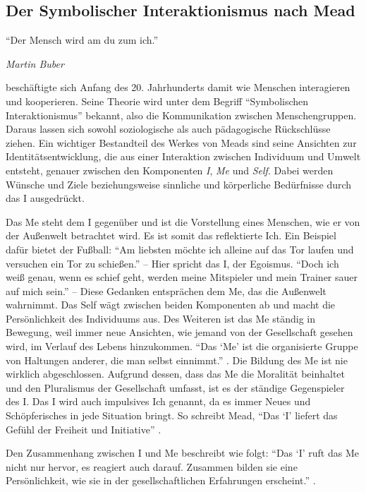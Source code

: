 \subsection{Der Symbolischer Interaktionismus nach Mead}

\epigraph{
		``Der Mensch wird am du zum ich.''}
	{
		\emph{Martin Buber
	}

\citeauthor{mead-1934en} beschäftigte sich Anfang des 20. Jahrhunderts damit wie Menschen interagieren und kooperieren.
Seine Theorie wird unter dem Begriff ``Symbolischen Interaktionismus'' bekannt, also die Kommunikation zwischen Menschengruppen.
Daraus lassen sich sowohl soziologische als auch pädagogische Rückschlüsse ziehen.
Ein wichtiger Bestandteil des Werkes von Meads sind seine Ansichten zur Identitätsentwicklung, die aus einer Interaktion zwischen Individuum und Umwelt entsteht, genauer zwischen den Komponenten \emph{I}, \emph{Me} und \emph{Self}.
Dabei werden Wünsche und Ziele beziehungsweise sinnliche und körperliche Bedürfnisse durch das I ausgedrückt.

Das Me steht dem I gegenüber und ist die Vorstellung eines Menschen, wie er von der Außenwelt betrachtet wird.
Es ist somit das reflektierte Ich.
Ein Beispiel dafür bietet der Fußball:
``Am liebsten möchte ich alleine auf das Tor laufen und versuchen ein Tor zu schießen.''
-- Hier spricht das I, der Egoismus.
``Doch ich weiß genau, wenn es schief geht, werden meine Mitspieler und mein Trainer sauer auf mich sein.''
-- Diese Gedanken entsprächen dem Me, das die Außenwelt wahrnimmt.
Das Self wägt zwischen beiden Komponenten ab und macht die Persönlichkeit des Individuums aus.
Des Weiteren ist das Me ständig in Bewegung, weil immer neue Ansichten, wie jemand von der Gesellschaft gesehen wird, im Verlauf des Lebens hinzukommen.
``Das `Me' ist die organisierte Gruppe von Haltungen anderer, die man selbst einnimmt.'' \citep[218]{mead-1934en}.
Die Bildung des Me ist nie wirklich abgeschlossen.
Aufgrund dessen, dass das Me die Moralität beinhaltet und den Pluralismus der Gesellschaft umfasst, ist es der ständige Gegenspieler des I.
Das I wird auch impulsives Ich genannt, da es immer Neues und Schöpferisches in jede Situation bringt.
So schreibt Mead,
``Das `I' liefert das Gefühl der Freiheit und Initiative'' \citep[221]{mead-1934en}.

Den Zusammenhang zwischen I und Me beschreibt \citeauthor{mead-1934en}  wie folgt:
``Das `I' ruft das Me nicht nur hervor, es reagiert auch darauf. Zusammen bilden sie eine Persönlichkeit, wie sie in der gesellschaftlichen Erfahrungen erscheint.'' \citep[221]{mead-1934en}.

}
